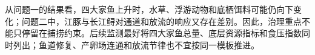 从问题一的结果看，四大家鱼上升时，水草、浮游动物和底栖饵料可能仍向下变化；问题二中，江豚与长江鲟对通道和放流的响应又存在差别。因此，治理重点不能只停留在捕捞约束。后续监测最好将四大家鱼总量、底层资源指标和食压指数同时列出；鱼道修复、产卵场连通和放流节律也不宜按同一模板推进。

